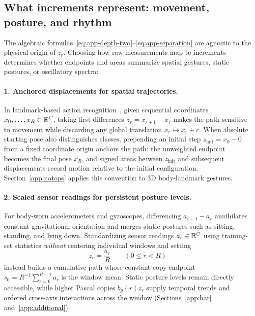 \subsection{What increments represent: movement, posture, and rhythm}
\label{app:spectral-meaning}
The algebraic formulas~\eqref{eq:app-depth-two}--\eqref{eq:app-separation} are
agnostic to the physical origin of \(z_r\). Choosing how raw measurements map to
increments determines whether endpoints and areas summarize spatial gestures,
static postures, or oscillatory spectra:

\paragraph{1. Anchored displacements for spatial trajectories.}
In landmark-based action recognition~\cite{yang,generalised}, given sequential
coordinates \(x_0, \ldots, x_R \in \mathbb{R}^C\), taking first differences
\(z_r = x_{r+1} - x_r\) makes the path sensitive to movement while discarding any
global translation \(x_r \mapsto x_r + c\). When absolute starting pose also
distinguishes classes, prepending an initial step \(z_{\mathrm{init}} = x_0 - 0\)
from a fixed coordinate origin anchors the path: the unweighted endpoint becomes
the final pose \(x_R\), and signed areas between \(z_{\mathrm{init}}\) and
subsequent displacements record motion relative to the initial configuration.
Section~\ref{app:natops} applies this convention to 3D body-landmark gestures.

\paragraph{2. Scaled sensor readings for persistent posture levels.}
For body-worn accelerometers and gyroscopes, differencing \(a_{r+1} - a_r\)
annihilates constant gravitational orientation and merges static postures such
as sitting, standing, and lying down. Standardizing sensor readings \(a_r \in \mathbb{R}^C\)
using training-set statistics \emph{without} centering individual windows and
setting
\[
 z_r = \frac{a_r}{R} \qquad (0 \leq r < R)
\]
instead builds a cumulative path whose constant-copy endpoint
\(s_0 = R^{-1}\sum_{r=0}^{R-1} a_r\) is the window mean. Static posture levels
remain directly accessible, while higher Pascal copies \(b_p(r) z_r\) supply
temporal trends and ordered cross-axis interactions across the window
(Sections~\ref{app:har} and~\ref{app:additional}).

